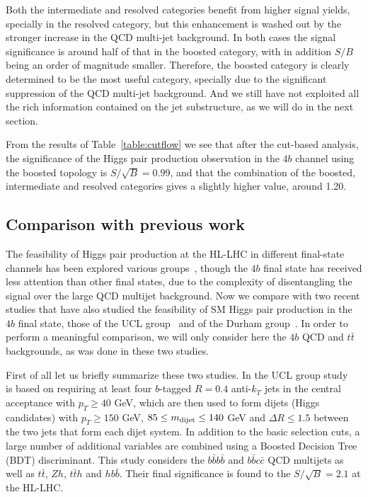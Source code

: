 Both the intermediate and resolved categories benefit from higher signal yields,
specially in the resolved category, but this enhancement is washed out by the stronger
increase in the QCD multi-jet background.
%
In both cases the signal significance is around half of that in the boosted category,
with in addition $S/B$ being an order of magnitude smaller.
%
Therefore, the boosted category is clearly determined to be the most useful category,
specially due to the significant suppression of the QCD multi-jet background.
%
And we still have not exploited all the rich information contained on the jet
substructure, as we will do in the next section.

From the results of Table~\ref{table:cutflow}
we see that after the cut-based analysis, the significance of the Higgs pair production
observation in the $4b$ channel using the boosted topology
is $S/\sqrt{B}=0.99$,
and that the combination
of the boosted, intermediate and resolved categories gives a slightly higher
value, around 1.20.
%

\subsection{Comparison with previous work}

The feasibility of Higgs pair production at the HL-LHC in different
final-state channels
has been explored various groups~\cite{Baur:2003gp,Barger:2013jfa,
  Baur:2003gpa,Barr:2013tda,Dolan:2013rja,
  Dolan:2012rv,Papaefstathiou:2012qe,Gouzevitch:2013qca,Cooper:2013kia,Wardrope:2014kya,deLima:2014dta}, though
the $4b$ final state has received less attention than other final states,
due to the complexity of disentangling the signal over the large
QCD multijet background.
%
Now we compare with two recent studies that have also studied the
feasibility of SM Higgs pair production in the $4b$ final state,
those of the UCL group~\cite{Wardrope:2014kya} and of the
Durham group~\cite{deLima:2014dta}.
%
In order to perform a meaningful comparison, we will only consider
here the $4b$ QCD and $t\bar{t}$ backgrounds, as was done
in these two studies.

First of all let us briefly summarize these two studies.
%
In the UCL group study~\cite{Wardrope:2014kya} is based
on requiring at least four $b$-tagged $R=0.4$ anti-$k_T$ jets
in the central acceptance with $p_T \ge 40$ GeV, which are
then used to form dijets (Higgs candidates) with
$p_T \ge 150$ GeV, $85 \le m_{\rm dijet} \le 140$ GeV
and $\Delta R \le 1.5$ between the two jets that form
each dijet system.
%
In addition to the basic selection cuts, a large number
of additional variables are combined using a
Boosted Decision Tree (BDT) discriminant.
%
This study considers the $b\bar{b}b\bar{b}$ and
$b\bar{b}c\bar{c}$ QCD multijets as well as
$t\bar{t}$, $Zh$, $t\bar{t}h$ and $hb\bar{b}$.
%
Their final significance is found to the $S/\sqrt{B}=2.1$ at the HL-LHC.

